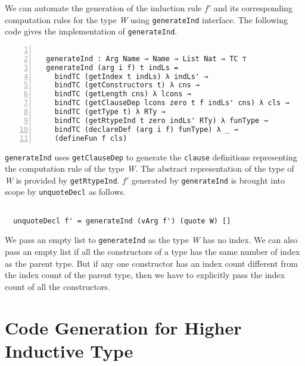\documentclass[sigplan,10pt]{acmart}
\begin{document}
We can automate the generation of the induction rule $f'$ and its corresponding computation rules for the type \emph{W} using {\tt generateInd} interface. The following code gives the implementation of {\tt generateInd}.

\begin{center}
\begingroup
\fontsize{7pt}{9pt}\selectfont
\begin{Verbatim}[frame = lines, rulecolor=\color{blue}, numbers = left, numbersep = 0pt]

  generateInd : Arg Name → Name → List Nat → TC ⊤
  generateInd (arg i f) t indLs =
    bindTC (getIndex t indLs) λ indLs' →
    bindTC (getConstructors t) λ cns →
    bindTC (getLength cns) λ lcons →
    bindTC (getClauseDep lcons zero t f indLs' cns) λ cls →
    bindTC (getType t) λ RTy →
    bindTC (getRtypeInd t zero indLs' RTy) λ funType → 
    bindTC (declareDef (arg i f) funType) λ _ →
    (defineFun f cls)

\end{Verbatim}
\endgroup
\end{center}

\normalsize

{\tt generateInd} uses {\tt getClauseDep} to generate the {\tt clause} definitions representing the computation rule of the type \emph{W}. The abstract representation of the type of \emph{W} is provided by {\tt getRtypeInd}. $f'$ generated by {\tt generateInd} is brought into scope by {\tt unquoteDecl} as follows.
\begin{center}
\begingroup
\fontsize{8pt}{9pt}\selectfont
\begin{Verbatim}

  unquoteDecl f' = generateInd (vArg f') (quote W) [] 

\end{Verbatim}
\endgroup
\end{center}
\normalsize

We pass an empty list to {\tt generateInd} as the type \emph{W} has no index. We can also pass an empty list if all the constructors of a type has the same number of index as the parent type. But if any one constructor has an index count different from the index count of the parent type, then we have to explicitly pass the index count of all the constructors.

\section{Code Generation for Higher Inductive Type}
\label{sec:sec4}
\end{document}
